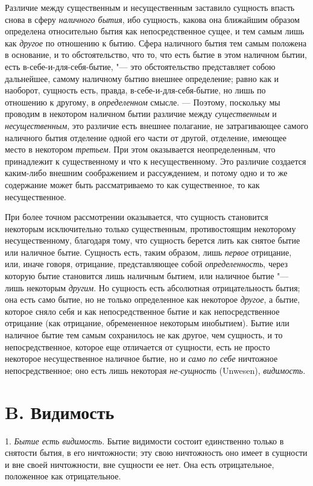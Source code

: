 Различие между существенным и несущественным заставило сущность впасть снова
в сферу {\em наличного бытия}, ибо сущность, какова она
ближайшим образом определена относительно бытия как непосредственное сущее,
и тем самым лишь как {\em другое} по отношению к бытию.
Сфера наличного бытия тем самым положена в основание, и то обстоятельство,
что то, что есть бытие в этом наличном бытии, есть в-себе-и-для-себя-бытие,
"--- это обстоятельство представляет собою дальнейшее, самому наличному бытию
внешнее определение; равно как и наоборот, сущность есть, правда,
в-себе-и-для-себя-бытие, но лишь по отношению к другому, в
{\em определенном} смысле. --- Поэтому, поскольку мы
проводим в некотором наличном бытии различие между
{\em существенным} и
{\em несущественным}, это различие есть внешнее
полагание, не затрагивающее самого наличного бытия отделение одной его
части от другой, отделение, имеющее место в некотором
{\em третьем}. При этом оказывается неопределенным, что
принадлежит к существенному и что к несущественному. Это различие создается
каким-либо внешним соображением и рассуждением, и потому одно и то же
содержание может быть рассматриваемо то как существенное, то как
несущественное.

При более точном рассмотрении оказывается, что сущность становится некоторым
исключительно только существенным, противостоящим некоторому
несущественному, благодаря тому, что сущность берется лить как снятое бытие
или наличное бытие. Сущность есть, таким образом, лишь
{\em первое} отрицание, или, иначе говоря, отрицание,
представляющее собой {\em определенность}, через
которую бытие становится лишь наличным бытием, или наличное бытие "--- лишь
некоторым {\em другим}. Но сущность есть абсолютная
отрицательность бытия; она есть само бытие, но не только определенное как
некоторое {\em другое}, а бытие, которое сняло себя и
как непосредственное бытие и как непосредственное отрицание (как отрицание,
обремененное некоторым инобытием). Бытие или наличное бытие тем самым
сохранилось не как другое, чем сущность, и то непосредственное, которое еще
отличается от сущности, есть не просто некоторое несущественное наличное
бытие, но и {\em само по себе} ничтожное
непосредственное; оно есть лишь некоторая
{\em не-сущность} (Unwesen),
{\em видимость}.

\section[B. Видимость]{B. Видимость}
1. {\em Бытие есть
видимость}. Бытие видимости состоит единственно только в снятости бытия, в
его ничтожности; эту свою ничтожность оно имеет в сущности и вне своей
ничтожности, вне сущности ее нет. Она есть отрицательное, положенное как
отрицательное.

